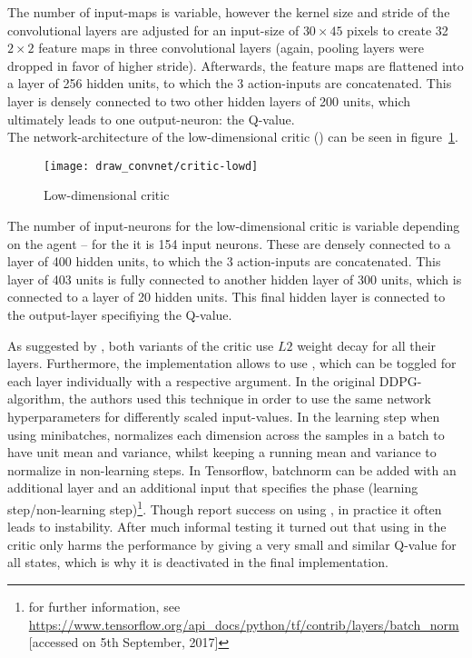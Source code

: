 The number of input-maps is variable, however the kernel size and stride of the convolutional layers are adjusted for an input-size of $30\times45$ pixels to create 32 $2\times2$ feature maps in three convolutional layers (again, pooling layers were dropped in favor of higher stride).  Afterwards, the feature maps are flattened into a layer of 256 hidden units, to which the 3 action-inputs are concatenated. This layer is densely connected to two other hidden layers of 200 units, which ultimately leads to one output-neuron: the Q-value.\\

\noindent The network-architecture of the low-dimensional critic () can be seen in figure~\ref{fig:lowdcrit}.

\begin{figure}[h]
	\centering 
	\texttt{[image: draw\_convnet/critic-lowd]}
	\caption{Low-dimensional critic}
	\label{fig:lowdcrit}
\end{figure}

The number of input-neurons for the low-dimensional critic is variable depending on the agent -- for the  it is 154 input neurons. These are densely connected to a layer of 400 hidden units, to which the 3 action-inputs are concatenated. This layer of 403 units is fully connected to another hidden layer of 300 units, which is connected to a layer of 20 hidden units. This final hidden layer is connected to the output-layer specifiying the Q-value.

As suggested by \cite{lillicrap_continuous_2015}, both variants of the critic use $L2$ weight decay for all their layers. Furthermore, the implementation allows to use \cite{ioffe_batch_2015}, which can be toggled for each layer individually with a respective argument. In the original DDPG-algorithm, the authors used this technique in order to use the same network hyperparameters for differently scaled input-values. In the learning step when using minibatches, \batchnorm normalizes each dimension across the samples in a batch to have unit mean and variance, whilst keeping a running mean and variance to normalize in non-learning steps. In Tensorflow, batchnorm can be added with an additional layer and an additional input that specifies the phase (learning step/non-learning step)\footnote{for further information, see \url{https://www.tensorflow.org/api\_docs/python/tf/contrib/layers/batch_norm} [accessed on 5th September, 2017]}. Though \cite{lillicrap_continuous_2015} report success on using \batchnorm, in practice it often leads to instability. After much informal testing it turned out that using \batchnorm in the critic only harms the performance by giving a very small and similar Q-value for all states, which is why it is deactivated in the final implementation.

